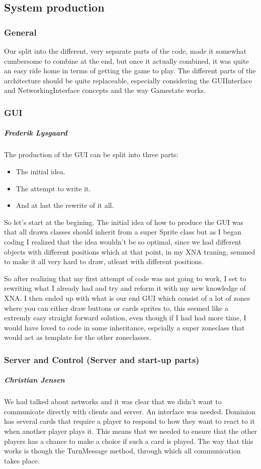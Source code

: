 \subsection{System production}
\subsubsection{General}
Our split into the different, very separate parts of the code, made it somewhat cumbersome to combine at the end, but once it actually combined, it was quite an easy ride home in terms of getting the game to play. The different parts of the architecture should be quite replaceable, especially considering the GUIInterface and NetworkingInterface concepts and the way Gamestate works.
\subsubsection{GUI}
\subparagraph{Frederik Lysgaard}
The production of the GUI can be split into three parts:
\begin{itemize}
\item The initial idea.
\item The attempt to write it.
\item  And at last the rewrite of it all.
\end{itemize}
So let's start at the begining. The initial idea of how to produce the GUI was that all drawn classes should inherit from a super Sprite class but as I began coding I realized that the idea wouldn't be so optimal, since we had different objects with different positions which at that point, in my XNA traning, semmed to make it all very hard to draw, atleast with different positions.

So after realizing that my first attempt of code was not going to work, I set to rewriting what I already had and try and reform it with my new knowledge of XNA.
I then ended up with what is our end GUI which consist of a lot of zones where you can either draw buttons or cards sprites to, this seemed like a extremly easy straight forward solution, even though if I had had more time, I would have loved to code in some inheritance, espcially a super zoneclass that would act as template for the other zoneclasses.

\subsubsection{Server and Control (Server and start-up parts)}
\subparagraph{Christian Jensen}
We had talked about networks and it was clear that we didn't want to communicate directly with clients and server. An interface was needed.
Dominion has several cards that require a player to respond to how they want to react to it when another player plays it. 
This means that we needed to ensure that the other players has a chance to make a choice if such a card is played. 
The way that this works is though the TurnMessage method, through which all communication takes place. 

